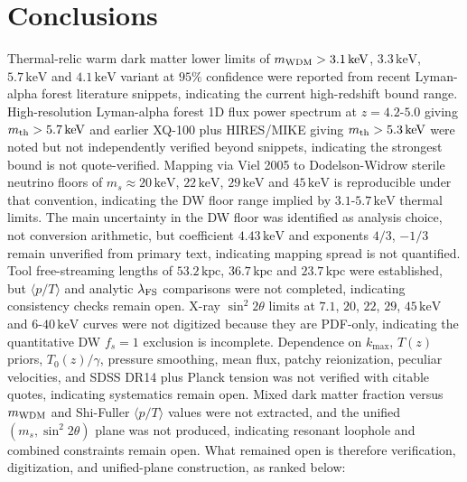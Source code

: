 \documentclass[11pt,a4paper]{article}
\begin{document}
\section{Conclusions}
Thermal-relic warm dark matter lower limits of $m_{\rm WDM} > 3.1\,\mathrm{keV}$, $3.3\,\mathrm{keV}$, $5.7\,\mathrm{keV}$ and $4.1\,\mathrm{keV}$ variant at $95\%$ confidence were reported from recent Lyman-alpha forest literature snippets, indicating the current high-redshift bound range. High-resolution Lyman-alpha forest 1D flux power spectrum at $z=4.2$-$5.0$ giving $m_{\rm th} > 5.7\,\mathrm{keV}$ and earlier XQ-100 plus HIRES/MIKE giving $m_{\rm th} > 5.3\,\mathrm{keV}$ were noted but not independently verified beyond snippets, indicating the strongest bound is not quote-verified. Mapping via Viel 2005 to Dodelson-Widrow sterile neutrino floors of $m_s \approx 20\,\mathrm{keV}$, $22\,\mathrm{keV}$, $29\,\mathrm{keV}$ and $45\,\mathrm{keV}$ is reproducible under that convention, indicating the DW floor range implied by $3.1$-$5.7\,\mathrm{keV}$ thermal limits. The main uncertainty in the DW floor was identified as analysis choice, not conversion arithmetic, but coefficient $4.43\,\mathrm{keV}$ and exponents $4/3$, $-1/3$ remain unverified from primary text, indicating mapping spread is not quantified. Tool free-streaming lengths of $53.2\,\mathrm{kpc}$, $36.7\,\mathrm{kpc}$ and $23.7\,\mathrm{kpc}$ were established, but $\langle p/T \rangle$ and analytic $\lambda_{\rm FS}$ comparisons were not completed, indicating consistency checks remain open. X-ray $\sin^2 2\theta$ limits at $7.1$, $20$, $22$, $29$, $45\,\mathrm{keV}$ and $6$-$40\,\mathrm{keV}$ curves were not digitized because they are PDF-only, indicating the quantitative DW $f_s=1$ exclusion is incomplete. Dependence on $k_{\max}$, $T(z)$ priors, $T_0(z)/\gamma$, pressure smoothing, mean flux, patchy reionization, peculiar velocities, and SDSS DR14 plus Planck tension was not verified with citable quotes, indicating systematics remain open. Mixed dark matter fraction versus $m_{\rm WDM}$ and Shi-Fuller $\langle p/T \rangle$ values were not extracted, and the unified $(m_s, \sin^2 2\theta)$ plane was not produced, indicating resonant loophole and combined constraints remain open. What remained open is therefore verification, digitization, and unified-plane construction, as ranked below:
\end{document}
